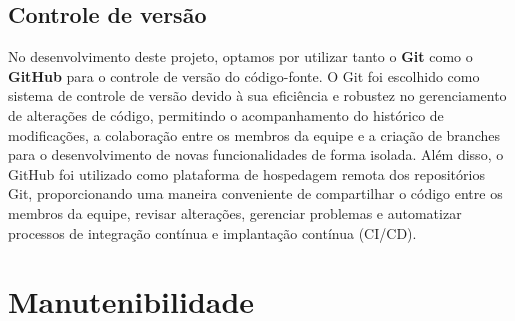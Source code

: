 \subsection{Controle de versão}
 No desenvolvimento deste projeto, optamos por utilizar tanto o \textbf{Git} como o \textbf{GitHub} para o controle de versão do código-fonte. O Git foi escolhido como sistema de controle de versão devido à sua eficiência e robustez no gerenciamento de alterações de código, permitindo o acompanhamento do histórico de modificações, a colaboração entre os membros da equipe e a criação de branches para o desenvolvimento de novas funcionalidades de forma isolada. Além disso, o GitHub foi utilizado como plataforma de hospedagem remota dos repositórios Git, proporcionando uma maneira conveniente de compartilhar o código entre os membros da equipe, revisar alterações, gerenciar problemas e automatizar processos de integração contínua e implantação contínua (CI/CD).

\section{Manutenibilidade}

